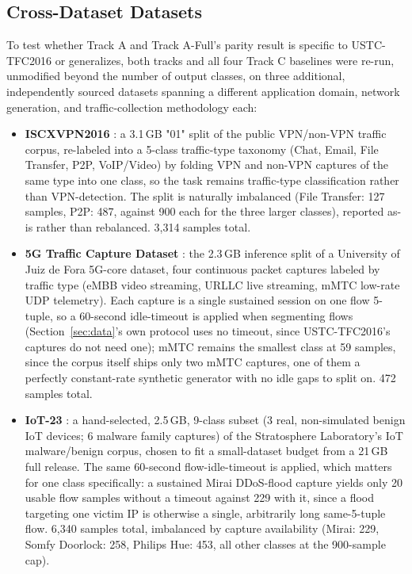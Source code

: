 \documentclass[journal]{IEEEtran}
\begin{document}
\subsection{Cross-Dataset Datasets}\label{sec:mcross}
To test whether Track A and Track A-Full's parity result is specific to USTC-TFC2016 or generalizes, both tracks and all four Track C baselines were re-run, unmodified beyond the number of output classes, on three additional, independently sourced datasets spanning a different application domain, network generation, and traffic-collection methodology each:

\begin{itemize}
\item \textbf{ISCXVPN2016} \cite{iscxvpn}: a 3.1\,GB "01" split of the public VPN/non-VPN traffic corpus, re-labeled into a 5-class traffic-type taxonomy (Chat, Email, File Transfer, P2P, VoIP/Video) by folding VPN and non-VPN captures of the same type into one class, so the task remains traffic-type classification rather than VPN-detection. The split is naturally imbalanced (File Transfer: 127 samples, P2P: 487, against 900 each for the three larger classes), reported as-is rather than rebalanced. 3,314 samples total.
\item \textbf{5G Traffic Capture Dataset} \cite{g5traffic}: the 2.3\,GB inference split of a University of Juiz de Fora 5G-core dataset, four continuous packet captures labeled by traffic type (eMBB video streaming, URLLC live streaming, mMTC low-rate UDP telemetry). Each capture is a single sustained session on one flow 5-tuple, so a 60-second idle-timeout is applied when segmenting flows (Section~\ref{sec:data}'s own protocol uses no timeout, since USTC-TFC2016's captures do not need one); mMTC remains the smallest class at 59 samples, since the corpus itself ships only two mMTC captures, one of them a perfectly constant-rate synthetic generator with no idle gaps to split on. 472 samples total.
\item \textbf{IoT-23} \cite{iot23}: a hand-selected, 2.5\,GB, 9-class subset (3 real, non-simulated benign IoT devices; 6 malware family captures) of the Stratosphere Laboratory's IoT malware/benign corpus, chosen to fit a small-dataset budget from a 21\,GB full release. The same 60-second flow-idle-timeout is applied, which matters for one class specifically: a sustained Mirai DDoS-flood capture yields only 20 usable flow samples without a timeout against 229 with it, since a flood targeting one victim IP is otherwise a single, arbitrarily long same-5-tuple flow. 6,340 samples total, imbalanced by capture availability (Mirai: 229, Somfy Doorlock: 258, Philips Hue: 453, all other classes at the 900-sample cap).
\end{itemize}
\end{document}
